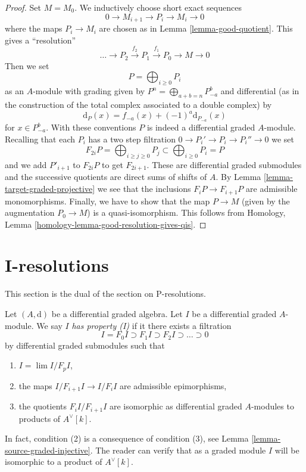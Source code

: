 \begin{proof}
Set $M = M_0$. We inductively choose short exact sequences
$$
0 \to M_{i + 1} \to P_i \to M_i \to 0
$$
where the maps $P_i \to M_i$ are chosen as in Lemma \ref{lemma-good-quotient}.
This gives a ``resolution''
$$
\ldots \to P_2 \xrightarrow{f_2} P_1 \xrightarrow{f_1} P_0 \to M \to 0
$$
Then we set
$$
P = \bigoplus\nolimits_{i \geq 0} P_i
$$
as an $A$-module with grading given by
$P^n = \bigoplus_{a + b = n} P_{-a}^b$ and
differential (as in the construction of the total complex associated
to a double complex) by
$$
\text{d}_P(x) = f_{-a}(x) + (-1)^a \text{d}_{P_{-a}}(x)
$$
for $x \in P_{-a}^b$. With these conventions $P$ is indeed a differential
graded $A$-module. Recalling that each $P_i$ has a two step filtration
$0 \to P_i' \to P_i \to P_i'' \to 0$ we set
$$
F_{2i}P = \bigoplus\nolimits_{i \geq j \geq 0} P_j
\subset
\bigoplus\nolimits_{i \geq 0} P_i = P
$$
and we add $P'_{i + 1}$ to $F_{2i}P$ to get $F_{2i + 1}$.
These are differential graded submodules and the successive quotients
are direct sums of shifts of $A$. By
Lemma \ref{lemma-target-graded-projective} we see that
the inclusions $F_iP \to F_{i + 1}P$ are admissible monomorphisms.
Finally, we have to show that the map $P \to M$ (given by the
augmentation $P_0 \to M$) is a quasi-isomorphism. This follows from
Homology, Lemma \ref{homology-lemma-good-resolution-gives-qis}.
\end{proof}





\section{I-resolutions}
\label{section-I-resolutions}

\noindent
This section is the dual of the section on P-resolutions.

\medskip\noindent
Let $(A, \text{d})$ be a differential graded algebra.
Let $I$ be a differential graded $A$-module. We say $I$
{\it has property (I)} if it there exists a filtration
$$
I = F_0I \supset F_1I \supset F_2I \supset \ldots \supset 0
$$
by differential graded submodules such that
\begin{enumerate}
\item $I = \lim I/F_pI$,
\item the maps $I/F_{i + 1}I \to I/F_iI$ are admissible epimorphisms,
\item the quotients $F_iI/F_{i + 1}I$ are isomorphic as differential
graded $A$-modules to products of $A^\vee[k]$.
\end{enumerate}
In fact, condition (2) is a consequence of condition (3), see
Lemma \ref{lemma-source-graded-injective}. The reader can verify that as
a graded module $I$ will be isomorphic to a product of $A^\vee[k]$.

